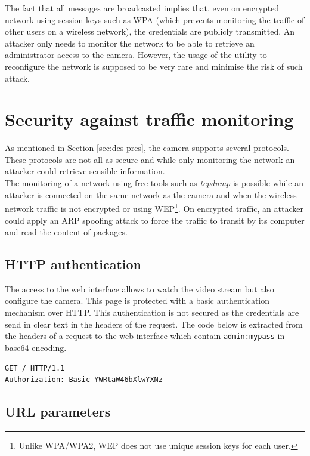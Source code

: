 The fact that all messages are broadcasted implies that, even on encrypted network using session keys such as WPA (which prevents monitoring the traffic of other users on a wireless network), the credentials are publicly transmitted.
An attacker only needs to monitor the network to be able to retrieve an administrator access to the camera.
However, the usage of the utility to reconfigure the network is supposed to be very rare and minimise the risk of such attack.

\section{Security against traffic monitoring}
\label{sec:dcs-proto}

As mentioned in Section \ref{sec:dcs-pres}, the camera supports several protocols.
These protocols are not all as secure and while only monitoring the network an attacker could retrieve sensible information.\\

The monitoring of a network using free tools such as \emph{tcpdump} is possible while an attacker is connected on the same network as the camera and when the wireless network traffic is not encrypted or using WEP\footnote{Unlike WPA/WPA2, WEP does not use unique session keys for each user.}.
On encrypted traffic, an attacker could apply an ARP spoofing attack to force the traffic to transit by its computer and read the content of packages.

\subsection{HTTP authentication}

The access to the web interface allows to watch the video stream but also configure the camera.
This page is protected with a basic authentication mechanism over HTTP.
This authentication is not secured as the credentials are send in clear text in the headers of the request.
The code below is extracted from the headers of a request to the web interface which contain \texttt{admin:mypass} in base64 encoding.

\begin{verbatim}
GET / HTTP/1.1
Authorization: Basic YWRtaW46bXlwYXNz
\end{verbatim}

\subsection{URL parameters}

